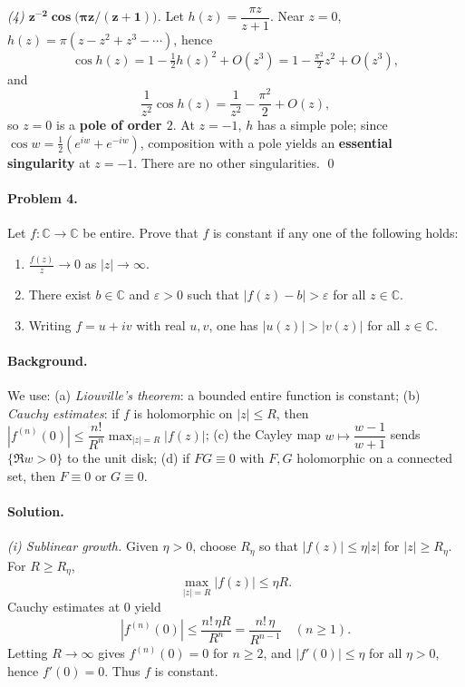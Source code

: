 \documentclass[11pt,a4paper]{article}
\theoremstyle{definition}
\theoremstyle{definition}
\theoremstyle{plain}
\theoremstyle{remark}
\begin{document}
\medskip
\emph{(4) $\boldsymbol{z^{-2}\cos\!\big(\pi z/(z+1)\big)}$.}
Let $h(z)=\dfrac{\pi z}{z+1}$.
Near $z=0$, $h(z)=\pi(z-z^{2}+z^{3}-\cdots)$, hence
\[
\cos h(z)=1-\tfrac12 h(z)^{2}+O(z^{3})=1-\tfrac{\pi^{2}}{2}z^{2}+O(z^{3}),
\]
and
\[
\frac{1}{z^{2}}\cos h(z)=\frac{1}{z^{2}}-\frac{\pi^{2}}{2}+O(z),
\]
so $z=0$ is a \textbf{pole of order $2$}. At $z=-1$, $h$ has a simple pole; since
$\cos w=\tfrac12(e^{iw}+e^{-iw})$, composition with a pole yields an \textbf{essential singularity}
at $z=-1$. There are no other singularities.
\qed

\paragraph{Problem 4.}
Let $f:\mathbb C\to\mathbb C$ be entire. Prove that $f$ is constant if any one of the following holds:
\begin{enumerate}[label=(\roman*)]
	\item $\displaystyle \frac{f(z)}{z}\to 0$ as $|z|\to\infty$.
	\item There exist $b\in\mathbb C$ and $\varepsilon>0$ such that $|f(z)-b|>\varepsilon$ for all $z\in\mathbb C$.
	\item Writing $f=u+iv$ with real $u,v$, one has $|u(z)|>|v(z)|$ for all $z\in\mathbb C$.
\end{enumerate}

\paragraph{Background.}
We use: (a) \emph{Liouville’s theorem}: a bounded entire function is constant; (b) \emph{Cauchy estimates}:
if $f$ is holomorphic on $|z|\le R$, then $|f^{(n)}(0)|\le \dfrac{n!}{R^n}\max_{|z|=R}|f(z)|$; 
(c) the Cayley map $w\mapsto \dfrac{w-1}{w+1}$ sends $\{\Re w>0\}$ to the unit disk; 
(d) if $FG\equiv 0$ with $F,G$ holomorphic on a connected set, then $F\equiv 0$ or $G\equiv 0$.

\paragraph{Solution.}

\emph{(i) Sublinear growth.}
Given $\eta>0$, choose $R_\eta$ so that $|f(z)|\le \eta|z|$ for $|z|\ge R_\eta$.
For $R\ge R_\eta$,
\[
\max_{|z|=R}|f(z)|\le \eta R.
\]
Cauchy estimates at $0$ yield
\[
|f^{(n)}(0)|\le \frac{n!\,\eta R}{R^n}=\frac{n!\,\eta}{R^{n-1}}\quad(n\ge 1).
\]
Letting $R\to\infty$ gives $f^{(n)}(0)=0$ for $n\ge 2$, and $|f'(0)|\le \eta$ for all $\eta>0$, hence $f'(0)=0$.
Thus $f$ is constant.
\end{document}
